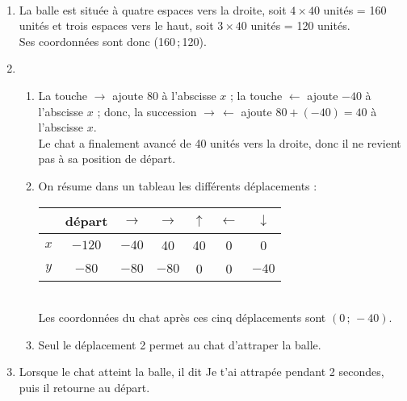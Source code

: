    \ \\ [-5mm]
   \begin{enumerate}
      \item La balle est située à quatre espaces vers la droite, soit $4\times40$ unités = 160 unités et trois espaces vers le haut, soit $3\times40$ unités = 120 unités. \\
      Ses coordonnées sont donc {\blue (160\,;\,120)}.
      \item \\
      \begin{enumerate}
         \item La touche $\to$ ajoute 80 à l'abscisse $x$ ; la touche $\gets$ ajoute $-40$ à l'abscisse $x$ ; donc, la succession $\to \, \gets$ ajoute $80+(-40) =40$ à l'abscisse $x$. \\
         Le chat a finalement \og avancé \fg{} de 40 unités vers la droite, donc {\blue il ne revient pas à sa position de départ}.
         \item On résume dans un tableau les différents déplacements : \\ \smallskip
            {
            \begin{tabular}{|*{7}{c|}}
               \hline
               & départ & $\to$ & $\to$ & $\uparrow$ & $\gets$ & $\downarrow$ \\
               \hline
               $x$ & $-120$ & $-40$ & 40 & 40 & 0 & 0 \\
               \hline
               $y$ & $-80$ & $-80$ & $-80$ & 0 & 0 & $-40$ \\
               \hline
            \end{tabular}} \\ \smallskip
         Les coordonnées du chat après ces cinq déplacements sont {\blue $(0\,;\,-40)$}.
         \item Seul le {\blue déplacement 2} permet au chat d'attraper la balle.
      \end{enumerate}
      \setcounter{enumi}{2}
      \item Lorsque le chat atteint la balle, {\blue il dit \og Je t'ai attrapée \fg{} pendant 2 secondes}, puis il retourne au départ.
   \end{enumerate}

